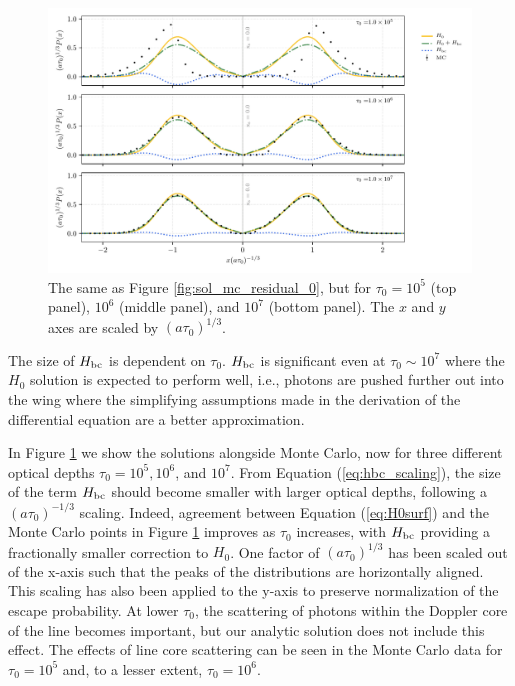 \documentclass[linenumbers]{aastex63}
\begin{document}
 \begin{figure}
    \centering
    \includegraphics[width=\textwidth]{tau_threepanel.pdf}
    \caption{The same as Figure \ref{fig:sol_mc_residual_0}, but for $\tau_0 = 10^5$ (top panel), $10^6$ (middle panel), and $10^7$ (bottom panel). The $x$ and $y$ axes are scaled by $(a\tau_0)^{1/3}$.}
    \label{fig:sol_mc_tau}
\end{figure}

The size of $H_{\rm bc}$ is dependent on $\tau_0$. $H_{\rm bc}$ is significant even at $\tau_0 {\sim} 10^7$ where the $H_0$ solution is expected to perform well, i.e., photons are pushed further out into the wing where the simplifying assumptions made in the derivation of the differential equation are a better approximation. 

In Figure \ref{fig:sol_mc_tau} we show the solutions alongside Monte Carlo, now for three different optical depths $\tau_0=10^5, 10^6$, and $10^7$. From Equation (\ref{eq:hbc_scaling}), the size of the term $H_{\rm bc}$ should become smaller with larger optical depths, following a $(a\tau_0)^{-1/3}$ scaling. Indeed, agreement between Equation (\ref{eq:H0surf}) and the Monte Carlo points in Figure \ref{fig:sol_mc_tau} improves as $\tau_0$ increases, with $H_{\rm bc}$ providing a fractionally smaller correction to $H_0$. One factor of $(a\tau_0)^{1/3}$ has been scaled out of the x-axis such that the peaks of the distributions are horizontally aligned. This scaling has also been applied to the y-axis to preserve normalization of the escape probability. At lower $\tau_0$, the scattering of photons within the Doppler core of the line becomes important, but our analytic solution does not include this effect. The effects of line core scattering can be seen in the Monte Carlo data for $\tau_0=10^5$ and, to a lesser extent, $
\tau_0=10^6$.
 
\end{document}
